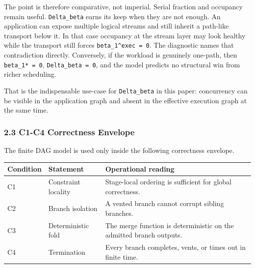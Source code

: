 \documentclass[
  11pt,
]{article}
\newcounter{none} %
\begin{document}
The point is therefore comparative, not imperial. Serial fraction and
occupancy remain useful. \texttt{Delta\_beta} earns its keep when they
are not enough. An application can expose multiple logical streams and
still inherit a path-like transport below it. In that case occupancy at
the stream layer may look healthy while the transport still forces
\texttt{beta\_1\^{}exec\ =\ 0}. The diagnostic names that contradiction
directly. Conversely, if the workload is genuinely one-path, then
\texttt{beta\_1*\ =\ 0}, \texttt{Delta\_beta\ =\ 0}, and the model
predicts no structural win from richer scheduling.

That is the indispensable use-case for \texttt{Delta\_beta} in this
paper: concurrency can be visible in the application graph and absent in
the effective execution graph at the same time.

\subsubsection{2.3 C1-C4 Correctness
Envelope}\label{c1-c4-correctness-envelope}

The finite DAG model is used only inside the following correctness
envelope.

{\def\LTcaptype{none} %
\begin{longtable}[]{@{}
  >{\raggedright\arraybackslash}p{}
  >{\raggedright\arraybackslash}p{}
  >{\raggedright\arraybackslash}p{}@{}}
\toprule\noalign{}
\begin{minipage}[b]{\linewidth}\raggedright
Condition
\end{minipage} & \begin{minipage}[b]{\linewidth}\raggedright
Statement
\end{minipage} & \begin{minipage}[b]{\linewidth}\raggedright
Operational reading
\end{minipage} \\
\midrule\noalign{}
\endhead
\bottomrule\noalign{}
\endlastfoot
C1 & Constraint locality & Stage-local ordering is sufficient for global
correctness. \\
C2 & Branch isolation & A vented branch cannot corrupt sibling
branches. \\
C3 & Deterministic fold & The merge function is deterministic on the
admitted branch outputs. \\
C4 & Termination & Every branch completes, vents, or times out in finite
time. \\
\end{longtable}
}
\end{document}
